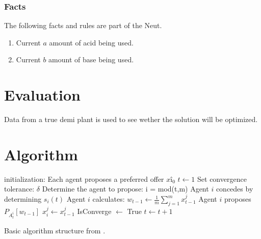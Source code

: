 \subsubsection{Facts}
The following facts and rules are part of the Neut.

\begin{enumerate}
	\item
	Current $a$ amount of acid being used.
	\item
	Current $b$ amount of base being used.
	
\end{enumerate}


%


\section{Evaluation}
Data from a true demi plant is used to see wether the solution will be optimized.

\clearpage
\section{Algorithm}

\begin{algorithm}
	initialization: Each agent proposes a preferred offer $xî_0$\;
	$t\leftarrow1$\;
	Set convergence tolerance: $\delta$\;
	{
		Determine the agent to propose: i = mod(t,m)\;
		{
			{
				Agent $i$ concedes by determining $s_i(t)$\;
				Agent $i$ calculates: $w_{t-1}\leftarrow \frac{1}{m}\sum_{j=1}^{m}x^j_{t-1}$\;
				Agent $i$ proposes $P_{A^i_t}[w_{t-1}]$\;
			}{
				$x^j_i \leftarrow x^j_{t-1}$\;
			}
		}
		{
			IsConverge $\leftarrow $ True\;
		}{
			$t \leftarrow t+1$\;
		}
	}
\caption{Basic algorithm structure from \citet{zheng2015automated}.}
\end{algorithm}

\todos
